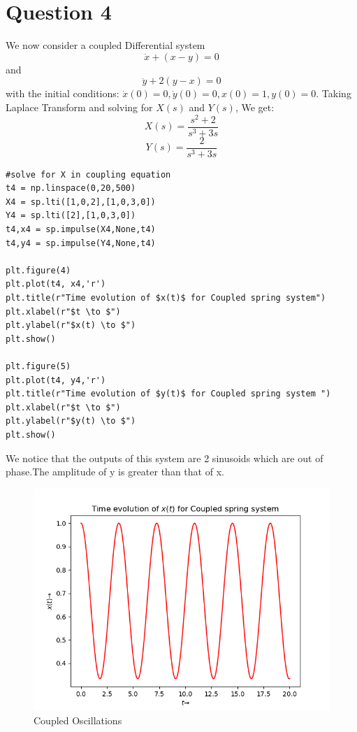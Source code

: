 \documentclass{article}
\begin{document}
\section*{Question 4}
We now consider a coupled Differential system
\begin{equation}
    \ddot x + (x-y) = 0
\end{equation}
and 
\begin{equation}
    \ddot y + 2(y-x) = 0
\end{equation}
with the initial conditions: $\dot x(0) =0,\dot y(0) =0,x(0) =1,y(0) =0$.
Taking Laplace Transform and solving for $X(s)$ and $Y(s)$, We get:
\begin{equation}
    X(s) = \frac{s^2+2}{s^3 + 3s}
\end{equation}
\begin{equation}
    Y(s) = \frac{2}{s^3 + 3s}
\end{equation}
\begin{verbatim}
#solve for X in coupling equation
t4 = np.linspace(0,20,500)
X4 = sp.lti([1,0,2],[1,0,3,0])
Y4 = sp.lti([2],[1,0,3,0])	
t4,x4 = sp.impulse(X4,None,t4)
t4,y4 = sp.impulse(Y4,None,t4)

plt.figure(4)   
plt.plot(t4, x4,'r')
plt.title(r"Time evolution of $x(t)$ for Coupled spring system")
plt.xlabel(r"$t \to $")
plt.ylabel(r"$x(t) \to $")
plt.show()

plt.figure(5)   
plt.plot(t4, y4,'r')
plt.title(r"Time evolution of $y(t)$ for Coupled spring system ")
plt.xlabel(r"$t \to $")
plt.ylabel(r"$y(t) \to $")
plt.show()
\end{verbatim}
We notice that the outputs of this system are 2 sinusoids which are out of phase.The amplitude of y is greater than that of x.
\begin{figure}[h!]
\centering
\includegraphics[scale=0.7]{fig8_6.png}
\caption{Coupled Oscillations}
\label{fig:Coupled Oscillations}
\end{figure}
\end{document}
